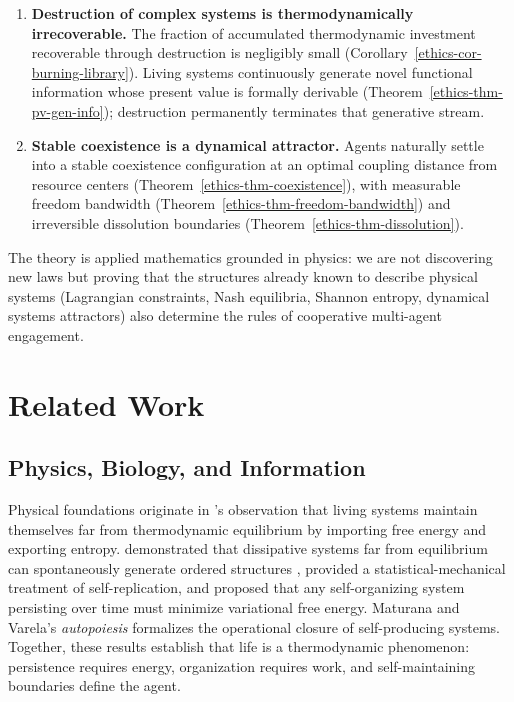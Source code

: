 \documentclass[11pt]{article}
\theoremstyle{plain}
\theoremstyle{definition}
\theoremstyle{remark}
\let\origsection\section
\renewcommand{\section}{\needspace{12\baselineskip}\origsection}
\let\origsubsection\subsection
\renewcommand{\subsection}{\needspace{7\baselineskip}\origsubsection}
\begin{document}
\begin{enumerate}
\def\labelenumi{\arabic{enumi}.}
\setcounter{enumi}{3}
\item
  \textbf{Destruction of complex systems is thermodynamically
  irrecoverable.} The fraction of accumulated thermodynamic investment
  recoverable through destruction is negligibly small
  (Corollary~\ref{ethics-cor-burning-library}). Living systems
  continuously generate novel functional information whose present value
  is formally derivable (Theorem~\ref{ethics-thm-pv-gen-info});
  destruction permanently terminates that generative stream.
\item
  \textbf{Stable coexistence is a dynamical attractor.} Agents naturally
  settle into a stable coexistence configuration at an optimal coupling
  distance from resource centers (Theorem~\ref{ethics-thm-coexistence}),
  with measurable freedom bandwidth
  (Theorem~\ref{ethics-thm-freedom-bandwidth}) and irreversible
  dissolution boundaries (Theorem~\ref{ethics-thm-dissolution}).
\end{enumerate}

The theory is applied mathematics grounded in physics: we are not
discovering new laws but proving that the structures already known to
describe physical systems (Lagrangian constraints, Nash equilibria,
Shannon entropy, dynamical systems attractors) also determine the rules
of cooperative multi-agent engagement.

\section{Related Work}\label{related-work}

\subsection{Physics, Biology, and
Information}\label{physics-biology-and-information}

Physical foundations originate in \citet{Schrodinger1944}'s observation
that living systems maintain themselves far from thermodynamic
equilibrium by importing free energy and exporting entropy.
\citet{Prigogine1978} demonstrated that dissipative systems far from
equilibrium can spontaneously generate ordered structures
\citep{Nicolis1977}, \citet{England2013} provided a
statistical-mechanical treatment of self-replication, and
\citeauthor{Friston2006}
\citetext{\citeyear{Friston2006}; \citeyear{Friston2010}} proposed that
any self-organizing system persisting over time must minimize
variational free energy. Maturana and Varela's \emph{autopoiesis}
\citep{Maturana1980} formalizes the operational closure of
self-producing systems. Together, these results establish that life is a
thermodynamic phenomenon: persistence requires energy, organization
requires work, and self-maintaining boundaries define the agent.
\end{document}
